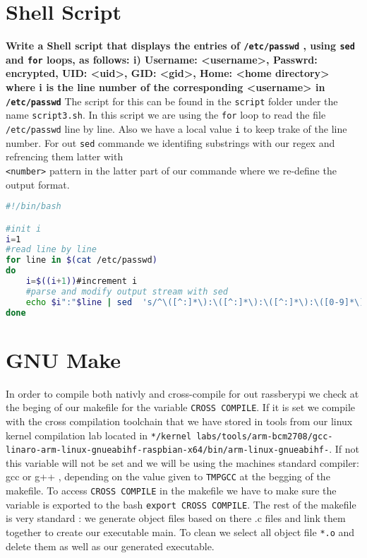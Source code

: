 \documentclass[a4paper,oneside,onecolumn]{article}
\newcommand{\code}[1]{\colorbox{codegray}{\texttt{#1}}}
\begin{document}
\section*{Shell Script}
\noindent
\textbf{Write a Shell script that displays the entries of
\texttt{/etc/passwd}
, using
\code{sed}
and
\code{for}
loops, as follows:
\newline
i) Username:  <username>, Passwrd:  encrypted, UID: <uid>, GID: <gid>, Home:  <home
directory>
\newline
where i
is the line number of the corresponding
<username>
in
\texttt{
/etc/passwd}
}
\newline
\newline
The script for this can be found in the \texttt{script} folder under the name \texttt{script3.sh}.
\newline
In this script we are using the \code{for} loop to read the file \texttt{/etc/passwd} line by line. Also we have a local value 
\code{i} to keep trake of the line number.  For out \code{sed} commande we identifing substrings with our regex and refrencing them latter with \code{\\ <number>} pattern
in the latter part of our commande where we re-define the output format.
\begin{lstlisting}[language=bash,caption={bash version}]
#!/bin/bash

#init i
i=1
#read line by line
for line in $(cat /etc/passwd)
do
    i=$((i+1))#increment i
    #parse and modify output stream with sed
    echo $i":"$line | sed  's/^\([^:]*\):\([^:]*\):\([^:]*\):\([0-9]*\):\([0-9]*\)::\([^:]*\).*/\1) Username: \2 ,Password: encrypted, UID: \4, GID: \5, Home: \6/'
done
\end{lstlisting}

\noindent
\section*{GNU Make}
In order to compile both nativly and cross-compile for out rassberypi we check at the beging of our makefile for the variable \code{CROSS COMPILE}. If it is set we compile with the cross compilation toolchain that we have stored in tools from our linux kernel compilation lab located in \texttt{*/kernel labs/tools/arm-bcm2708/gcc-linaro-arm-linux-gnueabihf-raspbian-x64/bin/arm-linux-gnueabihf-}. If not this variable will not be set and we will be using the machines standard compiler: gcc or g++ , depending on the value given to \code{TMPGCC} at the begging of the makefile.\newline
To access \code{CROSS COMPILE} in the makefile we have to make sure the variable is exported to the bash \code{export CROSS COMPILE}.
\newline
The rest of the makefile is very standard : we generate object files based on there .c files and link them together to create our executable main. To clean we select all object file \code{*.o} and delete them as well as our generated executable.
\end{document}
